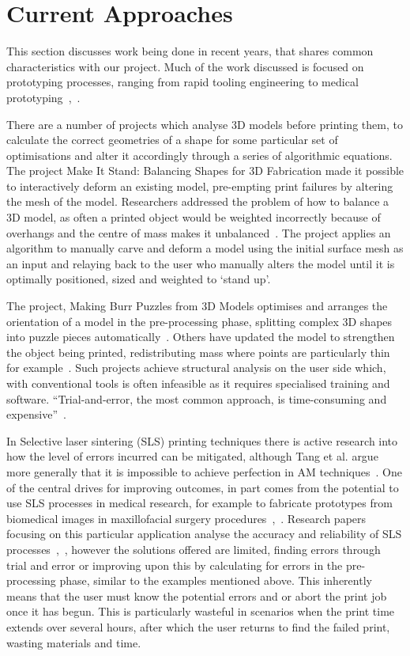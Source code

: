 \documentclass[pdftex, 11pt]{report} %
\begin{document}
\section{Current Approaches}
\label{section:CurrentApproaches}
This section discusses work being done in recent years, that shares common characteristics with our project. Much of the work discussed is focused on prototyping processes, ranging from rapid tooling engineering to medical prototyping~\cite{Radstok1999},~\cite{Onuh1999}. 

There are a number of projects which analyse 3D models before printing them, to calculate the correct geometries of a shape for some particular set of optimisations and alter it accordingly through a series of algorithmic equations. The project Make It Stand: Balancing Shapes for 3D Fabrication made it possible to interactively deform an existing model, pre-empting print failures by altering the mesh of the model. Researchers addressed the problem of how to balance a 3D model, as often a printed object would be weighted incorrectly because of overhangs and the centre of mass makes it unbalanced~\cite{Prevost2013}. The project applies an algorithm to manually carve and deform a model using the initial surface mesh as an input and relaying back to the user who manually alters the model until it is optimally positioned, sized and weighted to `stand up'. 

The project, Making Burr Puzzles from 3D Models optimises and arranges the orientation of a model in the pre-processing phase, splitting complex 3D shapes into puzzle pieces automatically~\cite{Xin2011}. Others have updated the model to strengthen the object being printed, redistributing mass where points are particularly thin for example~\cite{Stava2012}. Such projects achieve structural analysis on the user side which, with conventional tools is often infeasible as it requires specialised training and software. ``Trial-and-error, the most common approach, is time-consuming and expensive''~\cite{Zhou2013}. 

In Selective laser sintering (SLS) printing techniques there is active research into how the level of errors incurred can be mitigated, although Tang et al. argue more generally that it is impossible to achieve perfection in AM techniques~\cite{Tang2004}. One of the central drives for improving outcomes, in part comes from the potential to use SLS processes in medical research, for example to fabricate prototypes from biomedical images in maxillofacial surgery procedures~\cite{Silva2008},~\cite{Mallepree2009}. Research papers focusing on this particular application analyse the accuracy and reliability of SLS processes~\cite{Silva2008},~\cite{Mallepree2009}, however the solutions offered are limited, finding errors through trial and error or improving upon this by calculating for errors in the pre-processing phase, similar to the examples mentioned above. This inherently means that the user must know the potential errors and or abort the print job once it has begun. This is particularly wasteful in scenarios when the print time extends over several hours, after which the user returns to find the failed print, wasting materials and time. 
\end{document}
